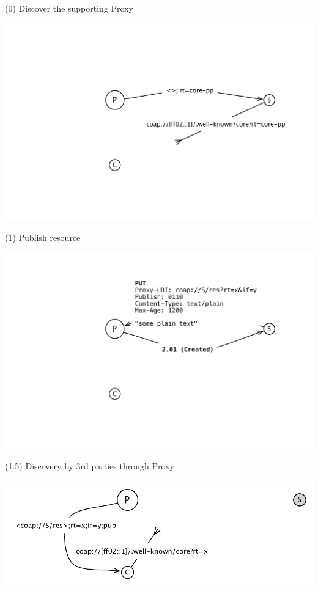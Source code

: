 \documentclass{beamer}
\begin{document}
\begin{frame}{(0) Discover the supporting Proxy}
 \begin{center}
  \includegraphics[width=\textwidth]{../../share/images/publish-1.pdf}
 \end{center}
\end{frame}


\begin{frame}{(1) Publish resource}
 \begin{center}
  \includegraphics[width=\textwidth]{../../share/images/publish0.pdf}
 \end{center}
\end{frame}

\begin{frame}{(1.5) Discovery by 3rd parties through Proxy}
 \begin{center}
  \includegraphics[width=\textwidth]{../../share/images/publish-disco.pdf}
 \end{center}
\end{frame}
\end{document}
